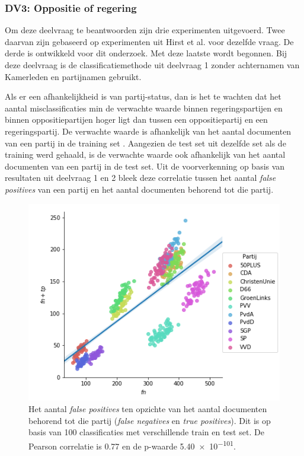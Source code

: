 \subsubsection{DV3: Oppositie of regering}
Om deze deelvraag te beantwoorden zijn drie experimenten uitgevoerd. Twee daarvan zijn gebaseerd op experimenten uit Hirst et al. \cite{Hirst_textto} voor dezelfde vraag. De derde is ontwikkeld voor dit onderzoek. Met deze laatste wordt begonnen. Bij deze deelvraag is de classificatiemethode uit deelvraag 1 zonder achternamen van Kamerleden en partijnamen gebruikt.\par
Als er een afhankelijkheid is van partij-status, dan is het te wachten dat het aantal misclassificaties min de verwachte waarde binnen regeringspartijen en binnen oppositiepartijen hoger ligt dan tussen een oppositiepartij en een regeringspartij. De verwachte waarde is afhankelijk van het aantal documenten van een partij in de training set \cite{Sahare}. Aangezien de test set uit dezelfde set als de training werd gehaald, is de verwachte waarde ook afhankelijk van het aantal documenten van een partij in de test set. Uit de voorverkenning op basis van resultaten uit deelvraag 1 en 2 bleek deze correlatie tussen het aantal \textit{false positives} van een partij en het aantal documenten behorend tot die partij.
\begin{figure}[H]
  \centering
    \includegraphics[width=0.60\paperwidth]{Verslag/Handmatig/Correlation.png}
\caption{Het aantal \textit{false positives} ten opzichte van het aantal documenten behorend tot die partij (\textit{false negatives} en \textit{true positives}). Dit is op basis van 100 classificaties met verschillende train en test set. De Pearson correlatie is 0.77 en de p-waarde \num{5.40e-101}.}
\label{fig:correlation}
\end{figure}
